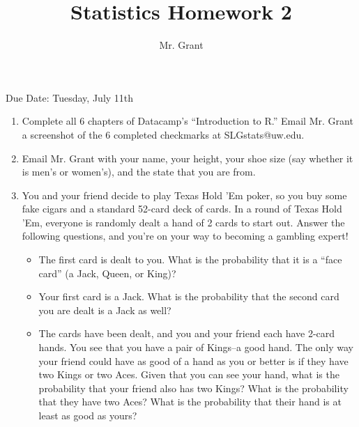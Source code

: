 \documentclass[12pt]{article}
\begin{document}
\title{Statistics Homework 2}
\author{Mr. Grant}
\maketitle

Due Date: Tuesday, July 11th

\begin{enumerate}
	\item Complete all 6 chapters of Datacamp's ``Introduction to R.'' Email Mr. Grant a screenshot of the 6 completed checkmarks at SLGstats@uw.edu.
	\item Email Mr. Grant with your name, your height, your shoe size (say whether it is men's or women's), and the state that you are from.
	\item You and your friend decide to play Texas Hold 'Em poker, so you buy some fake cigars and a standard 52-card deck of cards. In a round of Texas Hold 'Em, everyone is randomly dealt a hand of 2 cards to start out. Answer the following questions, and you're on your way to becoming a gambling expert!
	\begin{itemize}
		\item The first card is dealt to you. What is the probability that it is a ``face card'' (a Jack, Queen, or King)?
		\item Your first card is a Jack. What is the probability that the second card you are dealt is a Jack as well?
		\item The cards have been dealt, and you and your friend each have 2-card hands. You see that you have a pair of Kings--a good hand. The only way your friend could have as good of a hand as you or better is if they have two Kings or two Aces. Given that you can see your hand, what is the probability that your friend also has two Kings? What is the probability that they have two Aces? What is the probability that their hand is at least as good as yours?
	\end{itemize}
\end{enumerate}
\end{document}
